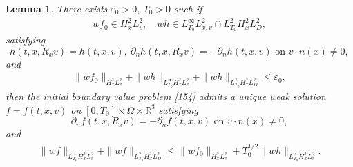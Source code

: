 \documentclass[reqno,a4paper]{amsart}
\newtheorem{Lem}[Thm]{Lemma}
\numberwithin{equation}{section}
\newcommand{\1}{\mathbf{1}}
\newcommand{\R}{\mathbb{R}}
\newcommand{\<}{\langle}
\renewcommand{\>}{\rangle}
\begin{document}
\begin{Lem}\label{Lem22}
	There exists $\varepsilon_0>0$, $T_0>0$ such if 
	\begin{align*}
		wf_0\in H^2_xL^2_v,\quad wh\in L^\infty_{T_0}L^2_{x,v}\cap L^2_{T_0}H^2_xL^2_{D},
	\end{align*}
	satisfying 
	\begin{equation*}
		h(t,x,R_xv)=h(t,x,v),\ \partial_nh(t,x,R_xv)=-\partial_nh(t,x,v)\text{ on }v\cdot n(x)\neq 0,
	\end{equation*} and 
	\begin{align}\label{156a}
		\|wf_0\|_{H^2_xL^2_v}+\|wh\|_{L^\infty_{T_0}H^2_xL^2_v}+\|wh\|_{L^2_{T_0}H^2_{x}L^2_{D}}\le \varepsilon_0,
	\end{align}
	then the initial boundary value problem \eqref{154} admits a unique weak solution $f=f(t,x,v)$ on $[0,T_0]\times\Omega\times\R^3$ satisfying
		\begin{equation}\label{411}
		\partial_nf(t,x,R_xv)=-\partial_nf(t,x,v)\text{ on }v\cdot n(x)\neq 0,
	\end{equation}
and 
	\begin{align}\label{158a}
		\|wf\|_{L^\infty_{T_0}H^2_xL^2_v}+\|wf\|_{L^2_{T_0}H^2_{x}L^2_{D}}\le \|wf_0\|_{H^2_xL^2_v}+T_0^{1/2}\|wh\|_{L^\infty_{T_0}H^2_xL^2_v}. 
	\end{align}
\end{Lem}
\end{document}
